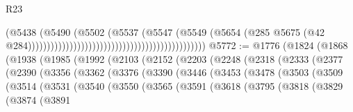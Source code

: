\begin{lexlean}{R23}
\begin{coremodule}
                                                                                (@5438
                                                                                  (@5490
                                                                                    (@5502
                                                                                      (@5537
                                                                                        (@5547
                                                                                          (@5549
                                                                                            (@5654
                                                                                              (@285
                                                                                                @5675
                                                                                                (@42
                                                                                                  @284)))))))))))))))))))))))))))))))))))))))))))))))
@5772 := @1776
    (@1824
      (@1868
        (@1938
          (@1985
            (@1992
              (@2103
                (@2152
                  (@2203
                    (@2248
                      (@2318
                        (@2333
                          (@2377
                            (@2390
                              (@3356
                                (@3362
                                  (@3376
                                    (@3390
                                      (@3446
                                        (@3453
                                          (@3478
                                            (@3503
                                              (@3509
                                                (@3514
                                                  (@3531
                                                    (@3540
                                                      (@3550
                                                        (@3565
                                                          (@3591
                                                            (@3618
                                                              (@3795
                                                                (@3818
                                                                  (@3829
                                                                    (@3874
                                                                      (@3891

\end{coremodule}
\end{lexlean}
